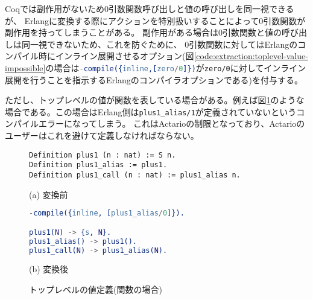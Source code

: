 Coqでは副作用がないため0引数関数呼び出しと値の呼び出しを同一視できるが、
Erlangに変換する際にアクションを特別扱いすることによって0引数関数が副作用を持ってしまうことがある。
副作用がある場合は0引数関数と値の呼び出しは同一視できないため、これを防ぐために、
0引数関数に対してはErlangのコンパイル時にインライン展開させるオプション(図\ref{code:extraction:toplevel-value-impossible}の場合は\lstinline[language=Erlang]|-compile({inline,[zero/0]})|が\lstinline{zero/0}に対してインライン展開を行うことを指示するErlangのコンパイラオプションである)を付与する。

ただし、トップレベルの値が関数を表している場合がある。例えば図\ref{code:extraction:toplevel-value-func}のような場合である。この場合はErlang側は\lstinline{plus1_alias/1}が定義されていないというコンパイルエラーになってしまう。
これはActarioの制限となっており、Actarioのユーザーはこれを避けて定義しなければならない。


\begin{figure}\centering
\begin{minipage}{1\textwidth}\centering
\begin{lstlisting}[frame=single,numbers=none,xleftmargin=0pt]
Definition plus1 (n : nat) := S n.
Definition plus1_alias := plus1.
Definition plus1_call (n : nat) := plus1_alias n.
\end{lstlisting}
(a) 変換前
\end{minipage}
\begin{minipage}{1\textwidth}\centering
\begin{lstlisting}[frame=single,numbers=none,xleftmargin=0pt,language=Erlang]
-compile({inline, [plus1_alias/0]}).

plus1(N) -> {s, N}.
plus1_alias() -> plus1().
plus1_call(N) -> plus1_alias(N).
\end{lstlisting}
(b) 変換後
\end{minipage}
\label{code:extraction:toplevel-value-func}
\caption{トップレベルの値定義(関数の場合)}
\end{figure}
